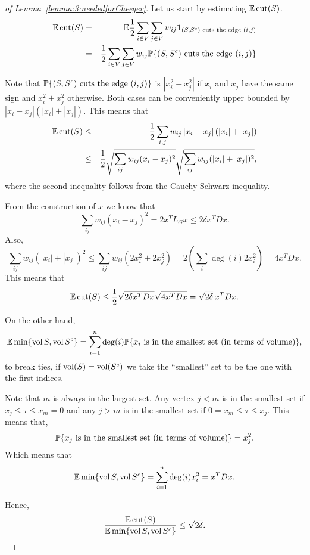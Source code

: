 \begin{proof}[of Lemma~\ref{lemma:3:neededforCheeger}]
Let us start by estimating $\mathbb{E} \operatorname{cut}(S)$.
\begin{eqnarray*}
\mathbb{E} \operatorname{cut}(S) & = & \mathbb{E} \frac12 \sum_{i\in V}\sum_{j\in V} w_{ij}\mathbf{1}_{(S,S^c) \text{ cuts the edge } (i,j)} \\
 & = & \frac12 \sum_{i\in V}\sum_{j\in V} w_{ij}{\mathbb{P}}\{  (S,S^c) \text{ cuts the edge } (i,j)  \}
\end{eqnarray*}

Note that $ {\mathbb{P}}\{  (S,S^c) \text{ cuts the edge } (i,j)  \} $ is  $\left| x_i^2 - x_j^2 \right| $ if $x_i$ and $x_j$ have the same sign and $x_i^2 + x_j^2$ otherwise. Both cases can be conveniently upper bounded by
$ \left| x_i - x_j\right| \left( | x_i | + |x_j | \right)$. This means that
\begin{eqnarray*}
\mathbb{E} \operatorname{cut}(S) & \leq  & \frac12 \sum_{i , j }w_{ij}  \left| x_i - x_j\right| \left( | x_i | + |x_j | \right) \\
 & \leq & \frac12\sqrt{  \sum_{ij}  w_{ij} (x_i-x_j)^2      } \sqrt{  \sum_{ij}  w_{ij} (|x_i|+|x_j|)^2      },
\end{eqnarray*}
where the second inequality follows from the Cauchy-Schwarz inequality.

From the construction of $x$ we know that
\[
 \sum_{ij}  w_{ij} (x_i-x_j)^2  = 2x^T L_G x \leq 2\delta x^TDx.
\]
Also,
\[
 \sum_{ij}  w_{ij} (|x_i|+|x_j|)^2 \leq  \sum_{ij}  w_{ij} (2x_i^2+2x_j^2)  %
 = 2 \left( \sum_i \deg(i)2x_i^2\right)
 = 4x^TDx.
\]
This means that
\[
\mathbb{E} \operatorname{cut}(S)  \leq \frac12 \sqrt{2\delta x^TDx} \sqrt{ 4 x^TDx} = \sqrt{2\delta }\, x^TDx.
\]

On the other hand,
\[
\mathbb{E} \min\{ \operatorname{vol}{S},\operatorname{vol}{S^c} \} = \sum_{i=1}^n \deg(i) {\mathbb{P}}\{ x_i \text{ is in the smallest set (in terms of volume)} \},
\]
to break ties, if $\operatorname{vol}(S) = \operatorname{vol}(S^c)$ we take the ``smallest'' set to be the one with the first indices.

Note that $m$ is always in the largest set. Any vertex $j<m$ is in the smallest set if $ x_j \leq  \tau \leq x_m = 0$ and any $j>m$ is in the smallest set if $0 = x_m \leq \tau \leq x_j$. This means that,
\[
{\mathbb{P}}\{ x_j \text{ is in the smallest set (in terms of volume)}\}  = x_j^2.
\]
Which means that
\[
\mathbb{E} \min\{ \operatorname{vol}{S},\operatorname{vol}{S^c} \} = \sum_{i=1}^n \deg(i)x_i^2 = x^TDx.
\]

Hence,
\[
\frac{\mathbb{E} \operatorname{cut}(S)  }{\mathbb{E} \min\{ \operatorname{vol}{S},\operatorname{vol}{S^c} \}} \leq \sqrt{2\delta}.
\]


\end{proof}
